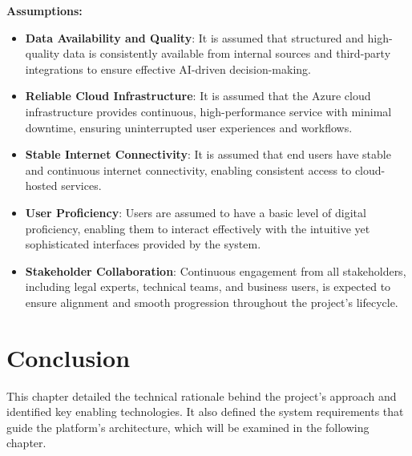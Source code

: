 \textbf{Assumptions:}
\begin{itemize}
    \item \textbf{Data Availability and Quality}: It is assumed that structured and high-quality data is consistently available from internal sources and third-party integrations to ensure effective AI-driven decision-making.
    \item \textbf{Reliable Cloud Infrastructure}: It is assumed that the Azure cloud infrastructure provides continuous, high-performance service with minimal downtime, ensuring uninterrupted user experiences and workflows.
    \item \textbf{Stable Internet Connectivity}: It is assumed that end users have stable and continuous internet connectivity, enabling consistent access to cloud-hosted services.
    \item \textbf{User Proficiency}: Users are assumed to have a basic level of digital proficiency, enabling them to interact effectively with the intuitive yet sophisticated interfaces provided by the system.
    \item \textbf{Stakeholder Collaboration}: Continuous engagement from all stakeholders, including legal experts, technical teams, and business users, is expected to ensure alignment and smooth progression throughout the project’s lifecycle.
\end{itemize}

\section{Conclusion}
This chapter detailed the technical rationale behind the project’s approach and identified key enabling technologies. It also defined the system requirements that guide the platform’s architecture, which will be examined in the following chapter.